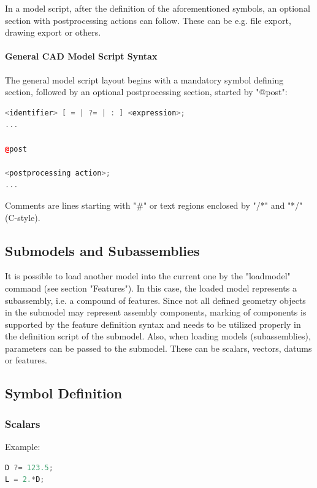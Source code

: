In a model script, after the definition of the aforementioned symbols,
an optional section with postprocessing actions can follow. 
These can be e.g. file export, drawing export or others.

\paragraph{General CAD Model Script Syntax}

The general model script layout begins with a mandatory symbol defining
section, followed by an optional postprocessing section, started by
"@post":

\begin{lstlisting}[language=c++]
<identifier> [ = | ?= | : ] <expression>;
...

@post

<postprocessing action>;
...
\end{lstlisting}

Comments are lines starting with "\#" or text regions enclosed by "/*"
and "*/" (C-style).

\subsection{Submodels and Subassemblies}

It is possible to load another model into the current one by the "loadmodel" command (see section "Features"). 
In this case, the loaded model represents a subassembly, i.e. a compound of features.
Since not all defined geometry objects in the submodel may represent assembly components, marking of components is supported by the feature definition syntax and needs to be utilized properly in the definition script of the submodel. 
Also, when loading models (subassemblies), parameters can be passed to the submodel. 
These can be scalars, vectors, datums or features.

\subsection{Symbol Definition}

\subsubsection{Scalars}

Example:

\begin{lstlisting}[language=c++]
D ?= 123.5;
L = 2.*D;
\end{lstlisting}

